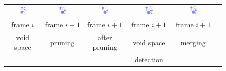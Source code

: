 \documentclass[usletter, 10pt, conference]{svjour3}      %
\begin{document}
\begin{figure}
\centering
{
\renewcommand{\tabcolsep}{1pt}
\begin{tabular}{cccccc}
\includegraphics[width=0.19\textwidth]{fig/rrtdyn2} &
\includegraphics[width=0.19\textwidth]{fig/rrtdyn3} &
\includegraphics[width=0.19\textwidth]{fig/rrtdyn4} & 
\includegraphics[width=0.19\textwidth]{fig/rrtdyn6} &
\includegraphics[width=0.19\textwidth]{fig/rrtdyn7} \\
 frame $i$ & frame $i+1$ & frame $i+1$ & frame $i+1$ & frame $i+1$ \\
void space & pruning & after pruning & void space  & merging \\
           &          &                & detection\\

\end{tabular}}
\end{figure}
\end{document}
